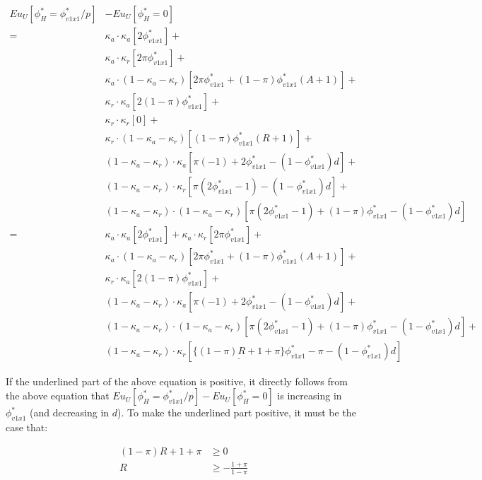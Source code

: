 \begin{align*}
	Eu_U[\phi^*_H = \phi^*_{v1x1}/p] &- Eu_U[\phi^*_H = 0] \\
	=& \kappa_a \cdot \kappa_a [ 2\phi^*_{v1x1}] + \\
	&\kappa_a \cdot \kappa_r [ 2 \pi \phi^*_{v1x1} ] + \\
	&\kappa_a \cdot (1-\kappa_a-\kappa_r) [ 2 \pi \phi^*_{v1x1} + (1-\pi)\phi^*_{v1x1}(A+1)] + \\
	&\kappa_r \cdot \kappa_a [ 2(1-\pi)\phi^*_{v1x1} ] + \\
	&\kappa_r \cdot \kappa_r [ 0 ] + \\
	&\kappa_r \cdot (1-\kappa_a-\kappa_r) [ (1-\pi)\phi^*_{v1x1}(R+1)] + \\
	&(1-\kappa_a-\kappa_r) \cdot \kappa_a [ \pi (-1) + 2\phi^*_{v1x1} - (1-\phi^*_{v1x1})d ] + \\
	&(1-\kappa_a-\kappa_r) \cdot \kappa_r [ \pi (2\phi^*_{v1x1}-1) - (1-\phi^*_{v1x1})d ] + \\
	&(1-\kappa_a-\kappa_r) \cdot (1-\kappa_a-\kappa_r) [ \pi (2\phi^*_{v1x1}-1) + (1-\pi)\phi^*_{v1x1} - (1-\phi^*_{v1x1})d ] \\
	=& \kappa_a \cdot \kappa_a [ 2\phi^*_{v1x1}] + \kappa_a \cdot \kappa_r [ 2 \pi \phi^*_{v1x1} ] + \\
	&\kappa_a \cdot (1-\kappa_a-\kappa_r) [ 2 \pi \phi^*_{v1x1} + (1-\pi)\phi^*_{v1x1}(A+1)] + \\
	&\kappa_r \cdot \kappa_a [ 2(1-\pi)\phi^*_{v1x1} ] + \\
	&(1-\kappa_a-\kappa_r) \cdot \kappa_a [ \pi (-1) + 2\phi^*_{v1x1} - (1-\phi^*_{v1x1})d ] + \\
	&(1-\kappa_a-\kappa_r) \cdot (1-\kappa_a-\kappa_r) [ \pi (2\phi^*_{v1x1}-1) + (1-\pi)\phi^*_{v1x1} - (1-\phi^*_{v1x1})d ] + \\
	&(1-\kappa_a-\kappa_r) \cdot \kappa_r [ \{ \underline{(1-\pi)R + 1 + \pi} \} \phi^*_{v1x1} - \pi - (1-\phi^*_{v1x1})d ]
\end{align*}

\par If the underlined part of the above equation is positive, it directly follows from the above equation that $Eu_U[\phi^*_H = \phi^*_{v1x1}/p] - Eu_U[\phi^*_H = 0]$ is increasing in $\phi^*_{v1x1}$ (and decreasing in $d$). To make the underlined part positive, it must be the case that:

\begin{align*}
	(1-\pi)R + 1 + \pi &\geq 0 \\
	R &\geq - \frac{1 + \pi}{1-\pi}
\end{align*}

